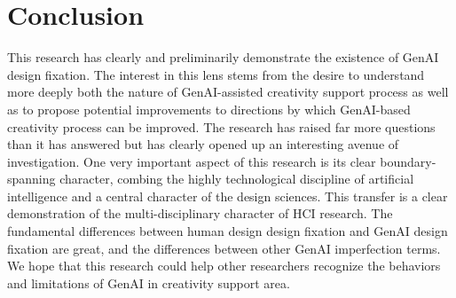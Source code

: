\section{Conclusion}
This research has clearly and preliminarily demonstrate the existence of GenAI design fixation. The interest in this lens stems from the desire to understand more deeply both the nature of GenAI-assisted creativity support process as well as to propose potential improvements to directions by which GenAI-based creativity process can be improved. The research has raised far more questions than it has answered but has clearly opened up an interesting avenue of investigation. One very important aspect of this research is its clear boundary-spanning character, combing the highly technological discipline of artificial intelligence and a central character of the design sciences. This transfer is a clear demonstration of the multi-disciplinary character of HCI research. The fundamental differences between human design design fixation and GenAI design fixation are great, and the differences between other GenAI imperfection terms. We hope that this research could help other researchers recognize the behaviors and limitations of GenAI in creativity support area.



